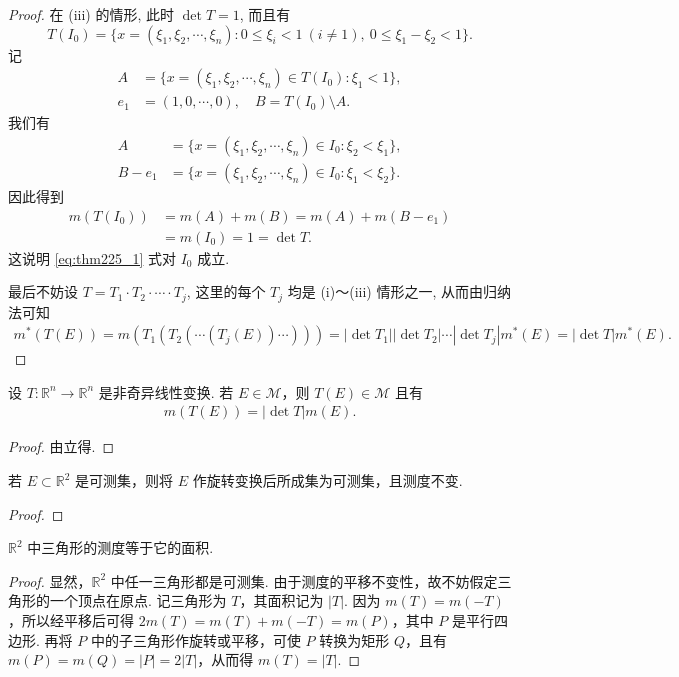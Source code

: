 \documentclass[../../main.tex]{subfiles}%
\begin{document}
\begin{proof}
在 (iii) 的情形, 此时 $\det T = 1$, 而且有
\[
T(I_0) = \{x = (\xi_1,\xi_2,\cdots,\xi_n): 0\leqslant\xi_i < 1\ (i\neq 1),\ 0\leqslant\xi_1 - \xi_2 < 1\}.
\]
记
\begin{align*}
A &= \{x = (\xi_1,\xi_2,\cdots,\xi_n)\in T(I_0): \xi_1 < 1\},\\
e_1 &= (1,0,\cdots,0),\quad B = T(I_0)\setminus A.
\end{align*}
我们有
\begin{align*}
A &= \{x = (\xi_1,\xi_2,\cdots,\xi_n)\in I_0: \xi_2 < \xi_1\},\\
B - e_1 &= \{x = (\xi_1,\xi_2,\cdots,\xi_n)\in I_0: \xi_1 < \xi_2\}.
\end{align*}
因此得到
\begin{align*}
m(T(I_0)) &= m(A) + m(B) = m(A) + m(B - e_1)\\
&= m(I_0) = 1 = \det T.
\end{align*}
这说明 \eqref{eq:thm225_1} 式对 $I_0$ 成立.

最后不妨设 $T = T_1\cdot T_2\cdot\cdots\cdot T_j$, 这里的每个 $T_j$ 均是 (i)～(iii) 情形之一, 从而由归纳法可知
\begin{align*}
m^*(T(E)) = m(T_1(T_2(\cdots(T_j(E))\cdots)))
= |\det T_1||\det T_2|\cdots|\det T_j|m^*(E)= |\det T|m^*(E).
\end{align*}
\end{proof}

\begin{corollary}
设 \(T:\mathbb{R}^n \to \mathbb{R}^n\) 是非奇异线性变换. 若 \(E \in \mathscr{M}\)，则 \(T(E)\in\mathscr{M}\) 且有
\begin{align*}
m(T(E)) = |\det T|m(E).
\end{align*}
\end{corollary}
\begin{proof}
由立得.
\end{proof}

\begin{example}
若 \(E \subset \mathbb{R}^2\) 是可测集，则将 \(E\) 作旋转变换后所成集为可测集，且测度不变.
\end{example}
\begin{proof}

\end{proof}

\begin{example}
\(\mathbb{R}^2\) 中三角形的测度等于它的面积.
\end{example}
\begin{proof}
显然，\(\mathbb{R}^2\) 中任一三角形都是可测集. 由于测度的平移不变性，故不妨假定三角形的一个顶点在原点. 记三角形为 \(T\)，其面积记为 \(|T|\). 因为 \(m(T)=m(-T)\)，所以经平移后可得 \(2m(T)=m(T)+m(-T)=m(P)\)，其中 \(P\) 是平行四边形. 再将 \(P\) 中的子三角形作旋转或平移，可使 \(P\) 转换为矩形 \(Q\)，且有 \(m(P)=m(Q)=|P| = 2|T|\)，从而得 \(m(T)=|T|\).
\end{proof}
\end{document}
